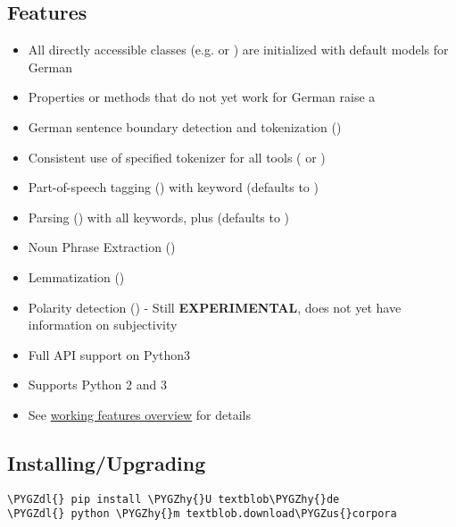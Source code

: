 \documentclass[letterpaper,10pt,english]{sphinxmanual}
\def\PYGZus{\char`\_}
\def\PYGZdl{\char`\$}
\def\PYGZhy{\char`\-}
\begin{document}
\subsection{Features}
\label{readme:features}\begin{itemize}
\item {} 
All directly accessible  classes (e.g.  or ) are initialized with default models for German

\item {} 
Properties or methods that do not yet work for German raise a 

\item {} 
German sentence boundary detection and tokenization ()

\item {} 
Consistent use of specified tokenizer for all tools ( or )

\item {} 
Part-of-speech tagging () with keyword  (defaults to )

\item {} 
Parsing () with all  keywords, plus  (defaults to )

\item {} 
Noun Phrase Extraction ()

\item {} 
Lemmatization ()

\item {} 
Polarity detection () - Still \textbf{EXPERIMENTAL}, does not yet have information on subjectivity

\item {} 
Full  API support on Python3

\item {} 
Supports Python 2 and 3

\item {} 
See \href{http://langui.ch/nlp/python/textblob-de/}{working features overview} for details

\end{itemize}


\subsection{Installing/Upgrading}
\label{readme:installing-upgrading}
\begin{Verbatim}[commandchars=\\\{\}]
\PYGZdl{} pip install \PYGZhy{}U textblob\PYGZhy{}de
\PYGZdl{} python \PYGZhy{}m textblob.download\PYGZus{}corpora
\end{Verbatim}
\end{document}
